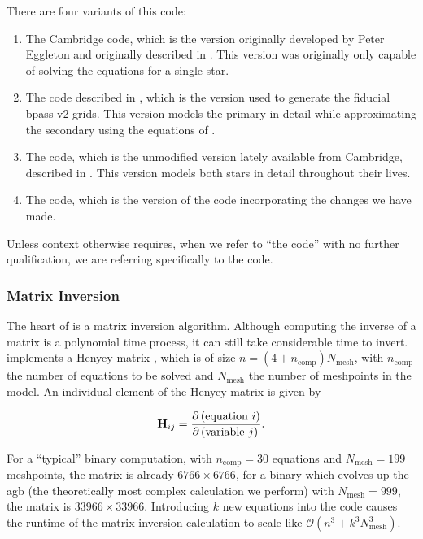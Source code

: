 There are four variants of this code:

\begin{enumerate}
    \item The Cambridge  code, which is the version originally developed by Peter Eggleton and originally described in \citet{Eggleton:1971}. This version was originally only capable of solving the equations for a single star.
    \item The  code described in \citet{Eldridge:2004, Eldridge:2004a, Eldridge:2008, Eldridge:2017}, which is the version used to generate the fiducial \gls{bpass} v2 grids. This version models the primary in detail while approximating the secondary using the equations of \citet{Hurley:2002}.
    \item The  code, which is the unmodified version lately available from Cambridge, described in \citet{Stancliffe:2009}. This version models both stars in detail throughout their lives.
    \item The  code, which is the version of the code incorporating the changes we have made.
\end{enumerate}

Unless context otherwise requires, when we refer to ``the  code'' with no further qualification, we are referring specifically to the  code.

\subsubsection{Matrix Inversion}

The heart of  is a matrix inversion algorithm. Although computing the inverse of a matrix is a polynomial time process, it can still take considerable time to invert.  implements a Henyey matrix \citep{Henyey:1964}, which is of size $n=(4+n_\text{comp})N_\text{mesh}$, with $n_\text{comp}$ the number of equations to be solved and $N_\text{mesh}$ the number of meshpoints in the model. An individual element of the Henyey matrix is given by

\begin{equation}
    \mat{H} = \pdv{\pqty{\text{equation } i}}{\pqty{\text{variable } j}}.
\end{equation}

For a ``typical'' binary computation, with $n_\text{comp}=30$ equations and $N_\text{mesh}=199$ meshpoints, the matrix is already $6766\times6766$, for a binary which evolves up the \gls{agb} (the theoretically most complex calculation we perform) with $N_\text{mesh}=999$, the matrix is $33966\times33966$. Introducing $k$ new equations into the code causes the runtime of the matrix inversion calculation to scale like $\mathcal{O}(n^3+k^3N_\text{mesh}^3)$.

